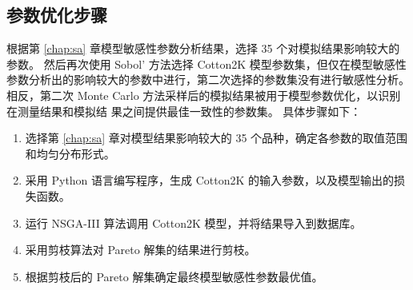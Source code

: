 \subsection{参数优化步骤}
根据第 \ref{chap:sa} 章模型敏感性参数分析结果，选择 35 个对模拟结果影响较大的参数。
然后再次使用 Sobol' 方法选择 Cotton2K 模型参数集，但仅在模型敏感性参数分析出的影响较大的参数中进行，第二次选择的参数集没有进行敏感性分析。%
相反，第二次 Monte Carlo 方法采样后的模拟结果被用于模型参数优化，以识别在测量结果和模拟结 果之间提供最佳一致性的参数集。%
具体步骤如下：
\begin{enumerate}
    \item 选择第 \ref{chap:sa} 章对模型结果影响较大的 35 个品种，确定各参数的取值范围和均匀分布形式。
    \item 采用 Python 语言编写程序，生成 Cotton2K 的输入参数，以及模型输出的损失函数。
    \item 运行 NSGA-III 算法调用 Cotton2K 模型，并将结果导入到数据库。
    \item 采用剪枝算法对 Pareto 解集的结果进行剪枝。
    \item 根据剪枝后的 Pareto 解集确定最终模型敏感性参数最优值。
\end{enumerate}
